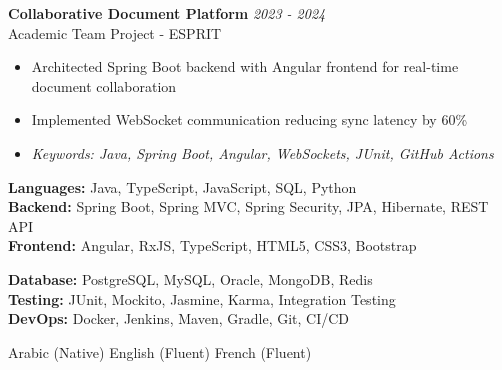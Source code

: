 \documentclass[11pt,a4paper]{article}
\begin{document}

\textbf{Collaborative Document Platform} \hfill \textit{2023 - 2024}\\[-2pt]
Academic Team Project - ESPRIT\\[-5pt]
\begin{itemize}[leftmargin=8pt,itemsep=1pt,topsep=2pt]
  \item Architected Spring Boot backend with Angular frontend for real-time document collaboration
  \item Implemented WebSocket communication reducing sync latency by 60\%
  \item[] \textit{\footnotesize Keywords: Java, Spring Boot, Angular, WebSockets, JUnit, GitHub Actions}
\end{itemize}\vspace{3pt}

{\small
\begin{minipage}[t]{0.48\textwidth}
  \textbf{Languages:} Java, TypeScript, JavaScript, SQL, Python\\[1.5pt]
  \textbf{Backend:} Spring Boot, Spring MVC, Spring Security, JPA, Hibernate, REST API\\[1.5pt]
  \textbf{Frontend:} Angular, RxJS, TypeScript, HTML5, CSS3, Bootstrap
\end{minipage}
\hfill
\begin{minipage}[t]{0.48\textwidth}
  \textbf{Database:} PostgreSQL, MySQL, Oracle, MongoDB, Redis\\[1.5pt]
  \textbf{Testing:} JUnit, Mockito, Jasmine, Karma, Integration Testing\\[1.5pt]
  \textbf{DevOps:} Docker, Jenkins, Maven, Gradle, Git, CI/CD
\end{minipage}
}

Arabic (Native) \textbar{} English (Fluent) \textbar{} French (Fluent)
\end{document}
